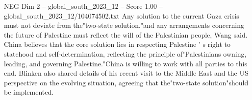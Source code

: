 \begin{textsample}{NEG Dim 2 – global\_south\_2023\_12 – Score 1.00 – global\_south\_2023\_12/104074502.txt}
Any solution to the current Gaza crisis must not deviate from the"two-state solution,"and any arrangements concerning the future of Palestine must reflect the will of the Palestinian people, Wang said.
China believes that the core solution lies in respecting Palestine ' s right to statehood and self-determination, reflecting the principle of"Palestinians owning, leading, and governing Palestine."China is willing to work with all parties to this end.
Blinken also shared details of his recent visit to the Middle East and the US perspective on the evolving situation, agreeing that the"two-state solution"should be implemented.

\end{textsample}
